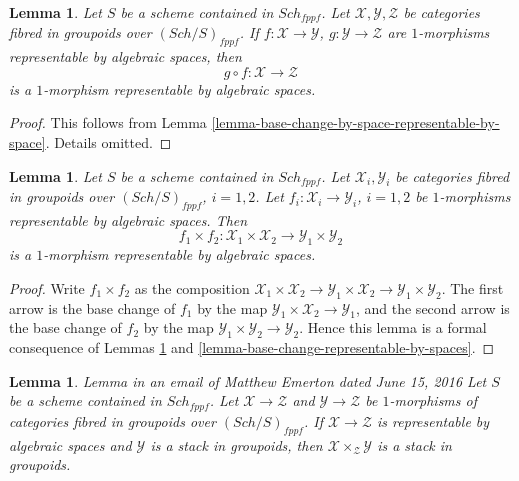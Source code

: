 \documentclass{stacks-project}
\newenvironment{reference}{\comment}{\endcomment}
\theoremstyle{plain}
\newtheorem{lemma}[subsection]{Lemma}
\theoremstyle{definition}
\theoremstyle{remark}
\numberwithin{equation}{subsection}
\def\Sch{\mathit{Sch}}
\begin{document}
\begin{lemma}
\label{lemma-composition-representable-by-spaces}
Let $S$ be a scheme contained in $\Sch_{fppf}$.
Let $\mathcal{X}, \mathcal{Y}, \mathcal{Z}$
be categories fibred in groupoids over $(\Sch/S)_{fppf}$.
If $f : \mathcal{X} \to \mathcal{Y}$, $g : \mathcal{Y} \to \mathcal{Z}$
are $1$-morphisms representable by algebraic spaces, then
$$
g \circ f : \mathcal{X} \longrightarrow \mathcal{Z}
$$
is a $1$-morphism representable by algebraic spaces.
\end{lemma}

\begin{proof}
This follows from
Lemma \ref{lemma-base-change-by-space-representable-by-space}.
Details omitted.
\end{proof}

\begin{lemma}
\label{lemma-product-representable-by-spaces}
Let $S$ be a scheme contained in $\Sch_{fppf}$.
Let $\mathcal{X}_i, \mathcal{Y}_i$ be categories fibred in groupoids over
$(\Sch/S)_{fppf}$, $i = 1, 2$.
Let $f_i : \mathcal{X}_i \to \mathcal{Y}_i$, $i = 1, 2$
be $1$-morphisms representable by algebraic spaces.
Then
$$
f_1 \times f_2 :
\mathcal{X}_1 \times \mathcal{X}_2
\longrightarrow
\mathcal{Y}_1 \times \mathcal{Y}_2
$$
is a $1$-morphism representable by algebraic spaces.
\end{lemma}

\begin{proof}
Write $f_1 \times f_2$ as the composition
$\mathcal{X}_1 \times \mathcal{X}_2 \to
\mathcal{Y}_1 \times \mathcal{X}_2 \to
\mathcal{Y}_1 \times \mathcal{Y}_2$.
The first arrow is the base change of $f_1$ by the map
$\mathcal{Y}_1 \times \mathcal{X}_2 \to \mathcal{Y}_1$, and the second arrow
is the base change of $f_2$ by the map
$\mathcal{Y}_1 \times \mathcal{Y}_2 \to \mathcal{Y}_2$.
Hence this lemma is a formal
consequence of Lemmas \ref{lemma-composition-representable-by-spaces}
and \ref{lemma-base-change-representable-by-spaces}.
\end{proof}

\begin{lemma}
\label{lemma-get-a-stack}
\begin{reference}
Lemma in an email of Matthew Emerton dated June 15, 2016
\end{reference}
Let $S$ be a scheme contained in $\Sch_{fppf}$.
Let $\mathcal{X} \to \mathcal{Z}$ and $\mathcal{Y} \to \mathcal{Z}$
be $1$-morphisms of categories fibred in groupoids over $(\Sch/S)_{fppf}$.
If $\mathcal{X} \to \mathcal{Z}$ is representable by algebraic spaces
and $\mathcal{Y}$ is a stack in groupoids, then
$\mathcal{X} \times_\mathcal{Z} \mathcal{Y}$ is a stack in groupoids.
\end{lemma}
\end{document}

